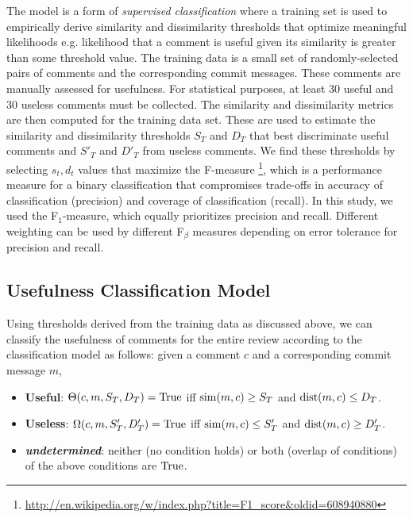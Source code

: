 The model is a form of \emph{supervised classification} %
where a training set is used to empirically derive similarity and dissimilarity thresholds that optimize meaningful likelihoods e.g. likelihood that a comment is useful given its similarity is greater than some threshold value.    
The training data is a small set of randomly-selected pairs of comments and the corresponding commit messages.
These comments are manually assessed for usefulness.
For statistical purposes, at least 30 useful and 30 useless comments must be collected.
The similarity and dissimilarity metrics are then computed for the training data set.
These are used to estimate the similarity and dissimilarity thresholds $S_T$ and $D_T$ that best discriminate useful comments and $S'_T$ and $D'_T$ from useless comments. 
We find these thresholds by selecting $s_t,d_t$ values that maximize the F-measure \footnote{\url{http://en.wikipedia.org/w/index.php?title=F1_score&oldid=608940880}},
which is a performance measure for a binary classification that compromises trade-offs in accuracy of classification (precision) and coverage of classification (recall).
In this study, we used the F$_1$-measure, which equally prioritizes precision and recall.
Different weighting can be used by different F$_\beta$ measures depending on error tolerance for precision and recall.


\subsection{Usefulness Classification Model} 
Using thresholds derived from the training data as discussed above, we can classify the usefulness of comments for the entire review according to the classification model as follows: given a comment $c$ and a corresponding commit message $m$,
\begin{itemize}
\item \textbf{Useful}: $\Theta(c,m,S_T,D_T) = \operatorname{True}$ iff $\operatorname{sim}(m,c) \geq S_T$ and $\operatorname{dist}(m,c) \leq D_T$.
\item \textbf{Useless}: $\Omega(c,m,S'_T,D'_T) = \operatorname{True}$ iff $\operatorname{sim}(m,c) \leq  S'_T$ and $\operatorname{dist}(m,c) \geq D'_T$.
\item \textbf{\emph{undetermined}}: neither (no condition holds) or both (overlap of conditions) of the above conditions are $\operatorname{True}$.
\end{itemize}


